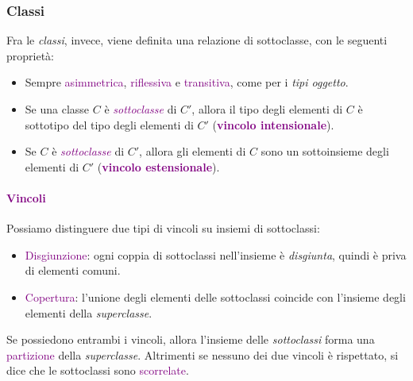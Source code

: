 \subsubsection{Classi}

Fra le \emph{classi}, invece, viene definita una relazione di sottoclasse, con le seguenti proprietà:
\begin{itemize}
    \item Sempre \textcolor{purple}{asimmetrica}, \textcolor{purple}{riflessiva} e
        \textcolor{purple}{transitiva}, come per i \emph{tipi oggetto}.
    \item Se una classe $C$ è \emph{\textcolor{purple}{sottoclasse}} di $C'$, allora il tipo degli elementi di
        $C$ è sottotipo del tipo degli elementi di $C'$ (\textbf{\textcolor{purple}{vincolo intensionale}}).
    \item Se $C$ è \emph{\textcolor{purple}{sottoclasse}} di $C'$, allora gli elementi di $C$ sono un sottoinsieme
        degli elementi di $C'$ (\textbf{\textcolor{purple}{vincolo estensionale}}).
\end{itemize}

\paragraph{\textcolor{purple}{Vincoli}} Possiamo distinguere due tipi di vincoli su insiemi di sottoclassi:
\begin{itemize}
    \item \textcolor{purple}{Disgiunzione}: ogni coppia di sottoclassi nell'insieme è \emph{disgiunta}, quindi è priva di elementi comuni.
    \item \textcolor{purple}{Copertura}: l'unione degli elementi delle sottoclassi coincide con l'insieme degli elementi della \emph{superclasse}.
\end{itemize}

Se possiedono entrambi i vincoli, allora l'insieme delle \emph{sottoclassi} forma una \textcolor{purple}{partizione} della \emph{superclasse}. Altrimenti se nessuno
dei due vincoli è rispettato, si dice che le sottoclassi sono \textcolor{purple}{scorrelate}.

